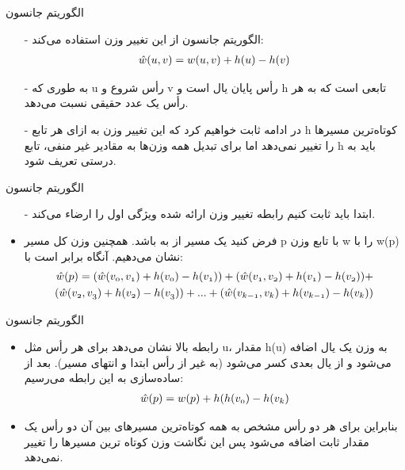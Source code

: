 \begin{frame}{الگوریتم جانسون}
	\begin{itemize}\itemr
\item[-]
الگوریتم جانسون از این تغییر وزن استفاده می‌کند:
\begin{align*}
	\mathnormal{\hat{w}(u, v)} = \mathnormal{w(u, v)} + h(u) - h(v)
\end{align*}
\item[-]
به طوری که u رأس شروع و v رأس پایان یال است و h تابعی است که به هر رأس یک عدد حقیقی نسبت می‌دهد.
\item[-]
در ادامه ثابت خواهیم کرد که این تغییر وزن به ازای هر تابع h کوتاه‌ترین مسیرها را تغییر نمی‌دهد اما برای تبدیل همه وزن‌ها به مقادیر غیر منفی، تابع h باید به درستی تعریف شود.
	\end{itemize}
\end{frame}
\begin{frame}{الگوریتم جانسون}
	\begin{itemize}\itemr
		\item[-]
		ابتدا باید ثابت ‌کنیم رابطه تغییر وزن ارائه شده ویژگی اول را ارضاء می‌کند.
		\item
		فرض کنید
		یک مسیر از
		به
		باشد. همچنین وزن کل مسیر p با تابع وزن w را با  w(p) نشان می‌دهیم. آنگاه
		برابر است با:
		\begin{align*}
			\mathnormal{\hat{w}(p)= (\hat{w}(v_0, v_1) + h(v_0) -  h(v_1)) + (\hat{w}(v_1, v_2) + h(v_1) -  h(v_2)) + }
			\\
			\mathnormal{(\hat{w}(v_2, v_3) + h(v_2) -  h(v_3)) + ... + (\hat{w}(v_{k-1}, v_k) + h(v_{k-1}) -  h(v_k))}
		\end{align*}

	\end{itemize}
\end{frame}
\begin{frame}{الگوریتم جانسون}
	\begin{itemize}\itemr
		\item
		رابطه بالا نشان می‌دهد برای هر رأس مثل u، مقدار h(u) به وزن یک یال اضافه می‌شود و از یال بعدی کسر می‌شود (به غیر از رأس ابتدا و انتهای مسیر). بعد از ساده‌سازی به این رابطه می‌رسیم:
		\begin{align*}
			\mathnormal{\hat{w}(p)=w(p) + h(h(v_0) - h(v_k)}
		\end{align*}
		\item
		بنابراین برای هر دو رأس مشخص به همه کوتاه‌ترین مسیرهای بین آن دو رأس یک مقدار ثابت اضافه می‌شود پس این نگاشت وزن کوتاه ترین مسیرها را تغییر نمی‌دهد.
	\end{itemize}
\end{frame}

